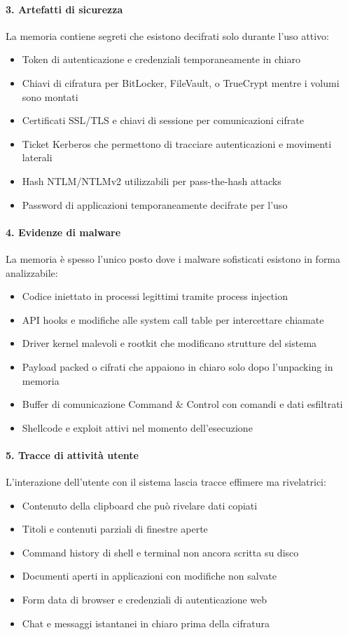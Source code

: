 \paragraph{3. Artefatti di sicurezza}
La memoria contiene segreti che esistono decifrati solo durante l'uso attivo:
\begin{itemize}
    \item Token di autenticazione e credenziali temporaneamente in chiaro
    \item Chiavi di cifratura per BitLocker, FileVault, o TrueCrypt mentre i volumi sono montati
    \item Certificati SSL/TLS e chiavi di sessione per comunicazioni cifrate
    \item Ticket Kerberos che permettono di tracciare autenticazioni e movimenti laterali
    \item Hash NTLM/NTLMv2 utilizzabili per pass-the-hash attacks
    \item Password di applicazioni temporaneamente decifrate per l'uso
\end{itemize}

\paragraph{4. Evidenze di malware}
La memoria è spesso l'unico posto dove i malware sofisticati esistono in forma analizzabile:
\begin{itemize}
    \item Codice iniettato in processi legittimi tramite process injection
    \item API hooks e modifiche alle system call table per intercettare chiamate
    \item Driver kernel malevoli e rootkit che modificano strutture del sistema
    \item Payload packed o cifrati che appaiono in chiaro solo dopo l'unpacking in memoria
    \item Buffer di comunicazione Command \& Control con comandi e dati esfiltrati
    \item Shellcode e exploit attivi nel momento dell'esecuzione
\end{itemize}

\paragraph{5. Tracce di attività utente}
L'interazione dell'utente con il sistema lascia tracce effimere ma rivelatrici:
\begin{itemize}
    \item Contenuto della clipboard che può rivelare dati copiati
    \item Titoli e contenuti parziali di finestre aperte
    \item Command history di shell e terminal non ancora scritta su disco
    \item Documenti aperti in applicazioni con modifiche non salvate
    \item Form data di browser e credenziali di autenticazione web
    \item Chat e messaggi istantanei in chiaro prima della cifratura
\end{itemize}

